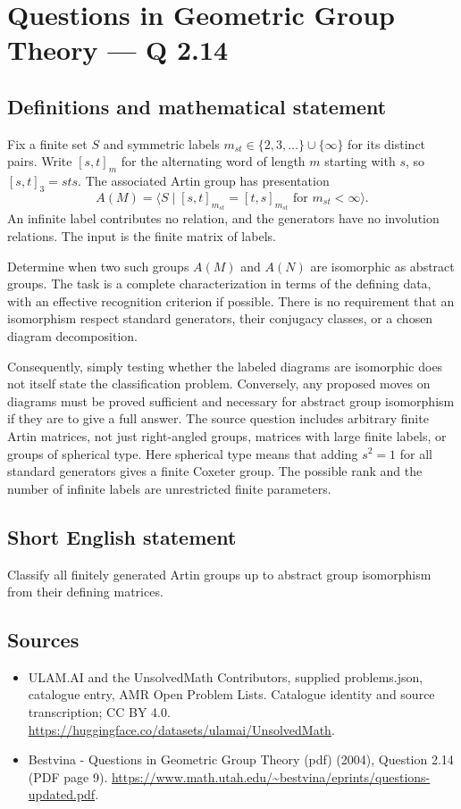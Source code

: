 \documentclass[11pt,a4paper]{article}
\begin{document}
\section*{Questions in Geometric Group Theory — Q 2.14}\label{statement}

\subsection{Definitions and mathematical statement}
Fix a finite set $S$ and symmetric labels $m_{st}\in\{2,3,\ldots\}\cup\{\infty\}$ for its distinct pairs. Write $[s,t]_m$ for the alternating word of length $m$ starting with $s$, so $[s,t]_3=sts$. The associated Artin group has presentation
\[
 A(M)=\langle S\mid [s,t]_{m_{st}}=[t,s]_{m_{st}}
                      \text{ for }m_{st}<\infty\rangle.
\]
An infinite label contributes no relation, and the generators have no involution relations. The input is the finite matrix of labels.

Determine when two such groups $A(M)$ and $A(N)$ are isomorphic as abstract groups. The task is a complete characterization in terms of the defining data, with an effective recognition criterion if possible. There is no requirement that an isomorphism respect standard generators, their conjugacy classes, or a chosen diagram decomposition.

Consequently, simply testing whether the labeled diagrams are isomorphic does not itself state the classification problem. Conversely, any proposed moves on diagrams must be proved sufficient and necessary for abstract group isomorphism if they are to give a full answer. The source question includes arbitrary finite Artin matrices, not just right-angled groups, matrices with large finite labels, or groups of spherical type. Here spherical type means that adding $s^2=1$ for all standard generators gives a finite Coxeter group. The possible rank and the number of infinite labels are unrestricted finite parameters.
\subsection{Short English statement}
Classify all finitely generated Artin groups up to abstract group isomorphism from their defining matrices.
\subsection{Sources}
\begin{itemize}
\item[S1] ULAM.AI and the UnsolvedMath Contributors, supplied problems.json, catalogue entry, AMR Open Problem Lists. Catalogue identity and source transcription; CC BY 4.0.
\url{https://huggingface.co/datasets/ulamai/UnsolvedMath}.
\item[S2] Bestvina - Questions in Geometric Group Theory (pdf) (2004), Question 2.14 (PDF page 9). 
\url{https://www.math.utah.edu/~bestvina/eprints/questions-updated.pdf}.
\end{itemize}
\end{document}
